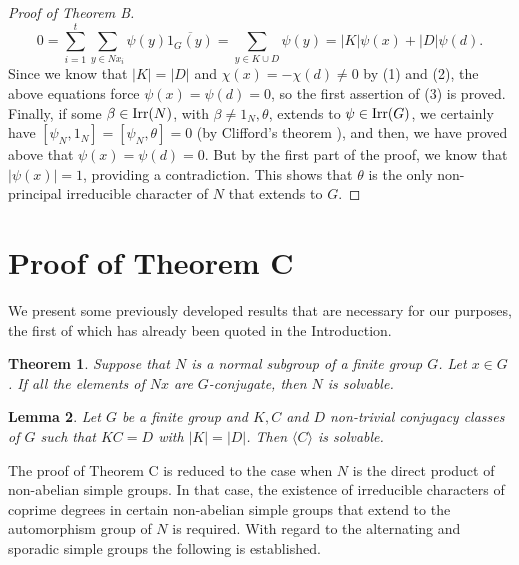 \documentclass[12pt,leqno,a4paper]{amsart}
\newtheorem{theorem}{Theorem}[section]
\newtheorem{lemma}[theorem]{Lemma}
\numberwithin{equation}{section}
\begin{document}
\begin{proof}[Proof of Theorem B]
$$0=\sum_{i=1}^t \sum_{y\in Nx_i} \psi(y)\overline{1_G(y)}= \sum_{y\in K \cup D} \psi(y)=|K|\psi(x) + |D|\psi(d).$$
Since we know that $|K|=|D|$ and  $\chi(x)=-\chi(d)\neq 0$ by (1) and (2),  the above equations force $\psi(x)=\psi(d)=0$, so  the first assertion of (3) is proved. Finally, if some $\beta\in {\rm Irr}(N)$, with $\beta \neq 1_N, \theta$, extends to $\psi\in{\rm Irr}(G)$, we certainly have  $[\psi_N, 1_N]=[\psi_N, \theta]=0$ (by Clifford's theorem \cite[Theorem 6.2]{Isaacs}), and then, we have proved above that $\psi(x)=\psi(d)=0$. But by the first part of the proof, we know that $|\psi(x)|=1$, providing a contradiction. This shows that $\theta$ is the only  non-principal irreducible character of $N$ that extends to  $G$.
\end{proof}














\section{Proof of Theorem C}

We present some previously developed results that are necessary for our purposes, the first of which has already been quoted in the Introduction.

\begin{theorem}{\normalfont  \cite[Theorem B(a)]{GN}}\label{11}
Suppose that $N$ is a normal subgroup of a finite group $G$. Let $x\in G$. If all the elements of $Nx$ are $G$-conjugate, then $N$ is solvable.
\end{theorem}

\begin{lemma} {\normalfont \cite[Lemma 2]{BCFM}}\label{12}
 Let $G$ be a finite group and $K, C$ and $D$ non-trivial conjugacy classes of $G$ such that
 $KC=D$ with $|K|=|D|$. Then $\langle C\rangle$ is solvable.
 \end{lemma}

 The proof of Theorem C is reduced to the case when $N$ is the direct product of non-abelian simple groups. In that case, the existence of irreducible characters of coprime degrees in certain non-abelian simple groups  that extend to the automorphism group of $N$ is required.  With regard to the alternating and sporadic  simple groups  the following is established.
\end{document}
